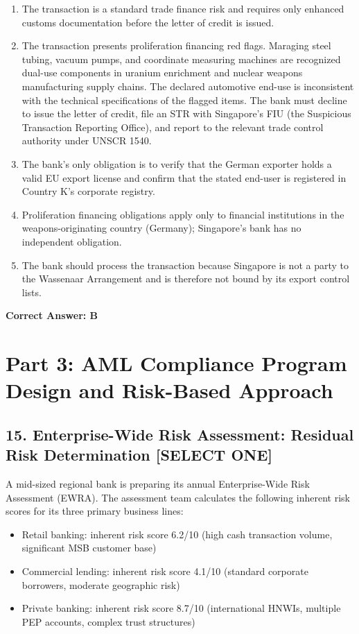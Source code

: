 \documentclass[11pt,a4paper]{article}
\begin{document}
	\begin{enumerate}[label=\Alph*.]
		\item The transaction is a standard trade finance risk and requires only enhanced customs documentation before the letter of credit is issued.
		\item The transaction presents proliferation financing red flags. Maraging steel tubing, vacuum pumps, and coordinate measuring machines are recognized dual-use components in uranium enrichment and nuclear weapons manufacturing supply chains. The declared automotive end-use is inconsistent with the technical specifications of the flagged items. The bank must decline to issue the letter of credit, file an STR with Singapore's FIU (the Suspicious Transaction Reporting Office), and report to the relevant trade control authority under UNSCR 1540.
		\item The bank's only obligation is to verify that the German exporter holds a valid EU export license and confirm that the stated end-user is registered in Country K's corporate registry.
		\item Proliferation financing obligations apply only to financial institutions in the weapons-originating country (Germany); Singapore's bank has no independent obligation.
		\item The bank should process the transaction because Singapore is not a party to the Wassenaar Arrangement and is therefore not bound by its export control lists.
	\end{enumerate}
	\textbf{Correct Answer: B}
	
	\section{Part 3: AML Compliance Program Design and Risk-Based Approach}
	
	\subsection{15. Enterprise-Wide Risk Assessment: Residual Risk Determination \textnormal{[SELECT ONE]}}
	
	A mid-sized regional bank is preparing its annual Enterprise-Wide Risk Assessment (EWRA). The assessment team calculates the following inherent risk scores for its three primary business lines:
	
	\begin{itemize}
		\item Retail banking: inherent risk score 6.2/10 (high cash transaction volume, significant MSB customer base)
		\item Commercial lending: inherent risk score 4.1/10 (standard corporate borrowers, moderate geographic risk)
		\item Private banking: inherent risk score 8.7/10 (international HNWIs, multiple PEP accounts, complex trust structures)
	\end{itemize}
	
\end{document}
